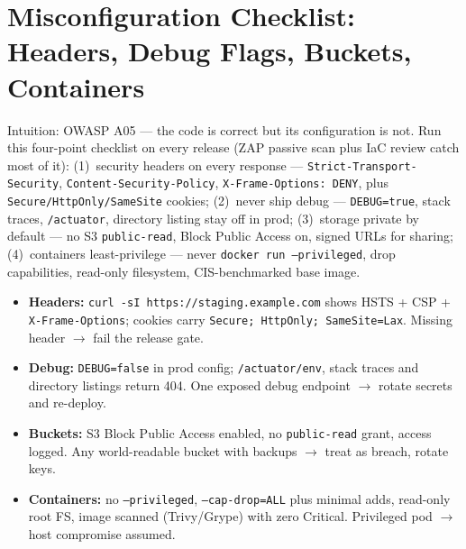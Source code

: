 \section{Misconfiguration Checklist: Headers, Debug Flags, Buckets, Containers}
\label{sec:misconfig}
Intuition: OWASP A05 --- the code is correct but its configuration is not. Run this four-point checklist on every release (ZAP passive scan plus IaC review catch most of it): (1)~security headers on every response --- \texttt{Strict-Transport-Security}, \texttt{Content-Security-Policy}, \texttt{X-Frame-Options: DENY}, plus \texttt{Secure/HttpOnly/SameSite} cookies; (2)~never ship debug --- \texttt{DEBUG=true}, stack traces, \texttt{/actuator}, directory listing stay off in prod; (3)~storage private by default --- no S3 \texttt{public-read}, Block Public Access on, signed URLs for sharing; (4)~containers least-privilege --- never \texttt{docker run --privileged}, drop capabilities, read-only filesystem, CIS-benchmarked base image.
\begin{itemize}[itemsep=0.45em]
    \item \textbf{Headers:} \texttt{curl -sI https://staging.example.com} shows HSTS + CSP + \texttt{X-Frame-Options}; cookies carry \texttt{Secure; HttpOnly; SameSite=Lax}. Missing header $\to$ fail the release gate.
    \item \textbf{Debug:} \texttt{DEBUG=false} in prod config; \texttt{/actuator/env}, stack traces and directory listings return 404. One exposed debug endpoint $\to$ rotate secrets and re-deploy.
    \item \textbf{Buckets:} S3 Block Public Access enabled, no \texttt{public-read} grant, access logged. Any world-readable bucket with backups $\to$ treat as breach, rotate keys.
    \item \textbf{Containers:} no \texttt{--privileged}, \texttt{--cap-drop=ALL} plus minimal adds, read-only root FS, image scanned (Trivy/Grype) with zero Critical. Privileged pod $\to$ host compromise assumed.
\end{itemize}


